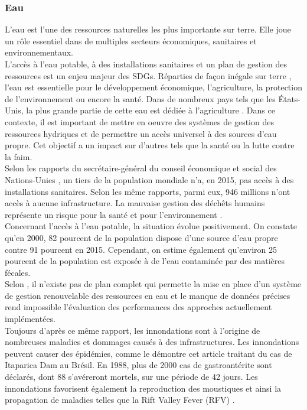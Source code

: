 \documentclass[10pt, conference, compsocconf]{llncs}
\begin{document}
		\subsubsection{Eau}
		L'eau est l'une des ressources naturelles les plus importante sur terre. Elle joue un rôle essentiel dans de multiples secteurs économiques, sanitaires et environnementaux.\\
		L'accès à l'eau potable, à des installations sanitaires et un plan de gestion des ressources est un enjeu majeur des SDGs. Réparties de façon inégale sur terre \cite{lefevre_repartition_nodate}, l'eau est essentielle pour le développement économique, l'agriculture, la protection de l'environnement ou encore la santé. Dans de nombreux pays tels que les États-Unis, la plus grande partie de cette eau est dédiée à l'agriculture \cite{gwt_global_nodate}. Dans ce contexte, il est important de mettre en oeuvre des systèmes de gestion des ressources hydriques et de permettre un accès universel à des sources d'eau propre. Cet objectif a un impact sur d'autres tels que la santé ou la lutte contre la faim.\\
		Selon les rapports du secrétaire-général du conseil économique et social des Nations-Unies \cite{united_nations_economic_and_social_council_progress_2017}\cite{united_nations_economic_and_social_council_progress_2017-1}, un tiers de la population mondiale n'a, en 2015, pas accès à des installations sanitaires. Selon les même rapports, parmi eux, 946 millions n'ont accès à aucune infrastructure. La mauvaise gestion des déchêts humains représente un risque pour la santé et pour l'environnement \cite{ashbolt_microbial_2004}.\\
		Concernant l'accès à l'eau potable, la situation évolue positivement. On constate qu'en 2000, 82 pourcent de la population dispose d'une source d'eau propre contre 91 pourcent en 2015. Cependant, on estime également qu'environ 25 pourcent de la population est exposée à de l'eau contaminée par des matières fécales\cite{united_nations_goal_nodate-4}. \\
		Selon \cite{rana_water_2017}, il n'existe pas de plan complet qui permette la mise en place d'un système de gestion renouvelable des ressources en eau et le manque de données précises rend impossible l'évaluation des performances des approches actuellement implémentées. \\
		Toujours d'après ce même rapport, les innondations sont à l'origine de nombreuses maladies et dommages causés à des infrastructures. Les innondations peuvent causer des épidémies, comme le démontre cet article \cite{texeira_gastroenteritis_1993} traitant du cas de Itaparica Dam au Brésil. En 1988, plus de 2000 cas de gastroantérite sont déclarés, dont 88 s'avéreront mortels, sur une période de 42 jours. Les innondations favorisent également la reproduction des moustiques et ainsi la propagation de maladies telles que la Rift Valley Fever (RFV) \cite{hanafi_rift_2010}.\\
\end{document}
